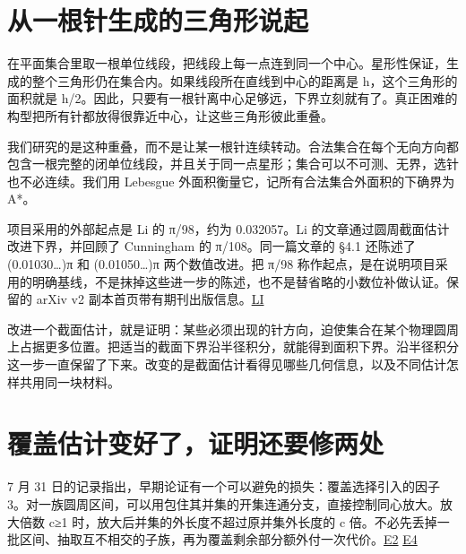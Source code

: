 \section{从一根针生成的三角形说起}\label{ux4eceux4e00ux6839ux9488ux751fux6210ux7684ux4e09ux89d2ux5f62ux8bf4ux8d77}

在平面集合里取一根单位线段，把线段上每一点连到同一个中心。星形性保证，生成的整个三角形仍在集合内。如果线段所在直线到中心的距离是 h，这个三角形的面积就是 \textbar h\textbar/2。因此，只要有一根针离中心足够远，下界立刻就有了。真正困难的构型把所有针都放得很靠近中心，让这些三角形彼此重叠。

我们研究的是这种重叠，而不是让某一根针连续转动。合法集合在每个无向方向都包含一根完整的闭单位线段，并且关于同一点星形；集合可以不可测、无界，选针也不必连续。我们用 Lebesgue 外面积衡量它，记所有合法集合外面积的下确界为 A*。

项目采用的外部起点是 Li 的 π/98，约为 \allowbreak{}0.032057。Li 的文章通过圆周截面估计改进下界，并回顾了 Cunningham 的 π/108。同一篇文章的 §\allowbreak{}4.1 还陈述了 (\allowbreak{}0.01030\ldots)π 和 (\allowbreak{}0.01050\ldots)π 两个数值改进。把 π/98 称作起点，是在说明项目采用的明确基线，不是抹掉这些进一步的陈述，也不是替省略的小数位补做认证。保留的 arXiv v2 副本首页带有期刊出版信息。\href{https://github.com/subfish-zhou/star-shaped-kakeya-lean/blob/6432d8eb33cc2093ed5ca1f5e63390e4bf065fd0/history-sources/D8-li-2026-arxiv-2509.05711v2.pdf}{LI}

改进一个截面估计，就是证明：某些必须出现的针方向，迫使集合在某个物理圆周上占据更多位置。把适当的截面下界沿半径积分，就能得到面积下界。沿半径积分这一步一直保留了下来。改变的是截面估计看得见哪些几何信息，以及不同估计怎样共用同一块材料。

\section{覆盖估计变好了，证明还要修两处}\label{ux8986ux76d6ux4f30ux8ba1ux53d8ux597dux4e86ux8bc1ux660eux8fd8ux8981ux4feeux4e24ux5904}

7 月 31 日的记录指出，早期论证有一个可以避免的损失：覆盖选择引入的因子 3。对一族圆周区间，可以用包住其并集的开集连通分支，直接控制同心放大。放大倍数 c≥1 时，放大后并集的外长度不超过原并集外长度的 c 倍。不必先丢掉一批区间、抽取互不相交的子族，再为覆盖剩余部分额外付一次代价。\href{https://github.com/subfish-zhou/star-shaped-kakeya-lean/blob/6432d8eb33cc2093ed5ca1f5e63390e4bf065fd0/history-sources/E2-APPROACH-PORTFOLIO.md}{E2} \href{https://github.com/subfish-zhou/star-shaped-kakeya-lean/blob/6432d8eb33cc2093ed5ca1f5e63390e4bf065fd0/history-sources/E4-SUPERSEDED-ROUND-1-PI56-AUDIT.md}{E4}

